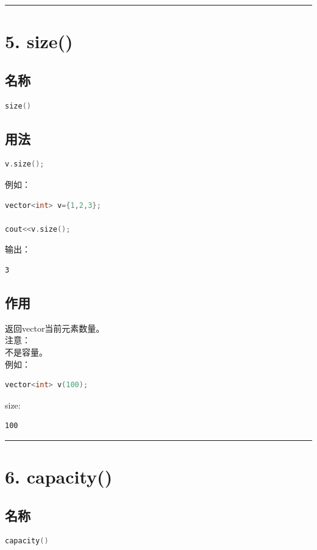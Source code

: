 \documentclass[9pt,twocolumn]{extarticle}
\begin{document}
\noindent\rule{\linewidth}{0.4pt}

\section{5. size()}

\subsection{名称}
\begin{lstlisting}[language=C++]
size()
\end{lstlisting}

\subsection{用法}
\begin{lstlisting}[language=C++]
v.size();
\end{lstlisting}
例如：
\begin{lstlisting}[language=C++]
vector<int> v={1,2,3};

cout<<v.size();
\end{lstlisting}
输出：
\begin{lstlisting}
3
\end{lstlisting}

\subsection{作用}
返回vector当前元素数量。\\
注意：\\
不是容量。\\
例如：
\begin{lstlisting}[language=C++]
vector<int> v(100);
\end{lstlisting}
size:
\begin{lstlisting}
100
\end{lstlisting}

\noindent\rule{\linewidth}{0.4pt}

\section{6. capacity()}

\subsection{名称}
\begin{lstlisting}[language=C++]
capacity()
\end{lstlisting}
\end{document}
